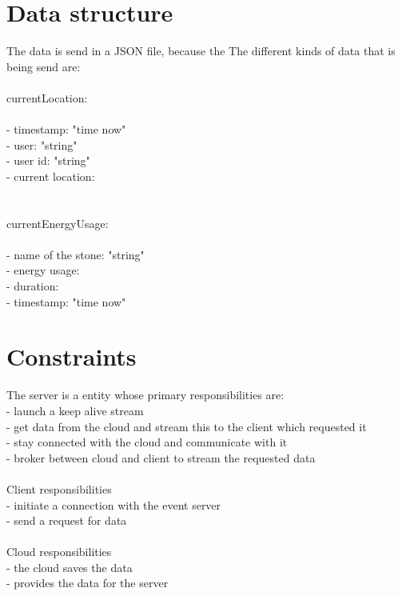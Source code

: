 \documentclass{article}
\begin{document}
\section{Data structure}
The data is send in a JSON file, because the 
The different kinds of data that is being send are: \\
\\
currentLocation:\\
\\
- timestamp: "time now"\\
- user: "string"\\
- user id: "string"\\ 
- current location: \\
\\
\\
currentEnergyUsage:\\
\\
- name of the stone: "string"\\
- energy usage: \\
- duration: \\
- timestamp: "time now"\\
\section{Constraints} 

The server is a entity whose primary responsibilities are: \\
- launch a keep alive stream\\
- get data from the cloud and stream this to the client which requested it\\
- stay connected with the cloud and communicate with it \\
- broker between cloud and client to stream the requested data\\
\\
Client responsibilities  \\
- initiate a connection with the event server\\
- send a request for data\\
\\
Cloud responsibilities  \\
-  the cloud saves the data\\
- provides the data for the server\\ 
\end{document}
